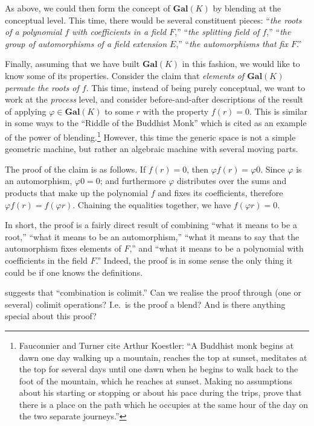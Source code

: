 As above, we could then form the concept of $\mathbf{Gal}(K)$ by blending
at the conceptual level.  This time, there would be several constituent pieces:
``\emph{the roots of a polynomial $f$ with coefficients in a field $F$},''
``\emph{the splitting field of $f$},''
``\emph{the group of automorphisms of a field extension $E$},''
``\emph{the automorphisms that fix $F$}.''

Finally, assuming that we have built $\mathbf{Gal}(K)$ in this
fashion, we would like to know some of its properties.  Consider the
claim that \emph{elements of $\mathbf{Gal}(K)$ permute the roots of
  $f$}.  This time, instead of being purely conceptual, we want to
work at the \emph{process} level, and consider before-and-after
descriptions of the result of applying $\varphi\in\mathbf{Gal}(K)$ to
some $r$ with the property $f(r)=0$.  This is similar in some ways to
the ``Riddle of the Buddhist Monk'' \cite{FaTu98b} which is cited as
an example of the power of blending.\footnote{Fauconnier and Turner
  cite Arthur Koestler: ``A Buddhist monk begins at dawn one day
  walking up a mountain, reaches the top at sunset, meditates at the
  top for several days until one dawn when he begins to walk back to
  the foot of the mountain, which he reaches at sunset.  Making no
  assumptions about his starting or stopping or about his pace during
  the trips, prove that there is a place on the path which he occupies
  at the same hour of the day on the two separate journeys.''}
However, this time the generic space is not a simple geometric machine,
but rather an algebraic machine with several moving parts.

The proof of the claim is as follows.  If $f(r)=0$, then $\varphi
f(r)=\varphi 0$.  Since $\varphi$ is an automorphism, $\varphi 0 = 0$;
and furthermore $\varphi$ distributes over the sums and products that
make up the polynomial $f$ and fixes its coefficients, therefore
$\varphi f(r)=f(\varphi r)$.  Chaining the equalities together, we
have $f(\varphi r)=0$.

In short, the proof is a fairly direct result of combining ``what it
means to be a root,'' ``what it means to be an automorphism,''
``what it means to say that the automorphism fixes elements of $F$,''
and
``what it means to be a polynomial with coefficients in the
field $F$.''
Indeed, the proof is in some sense the only thing it could be if one
knows the definitions.  

\cite{Go99c} suggests that ``combination is colimit.''  Can we realise
the proof through (one or several) colimit operations?  I.e.~is the
proof a blend?  And is there anything special about this proof?


